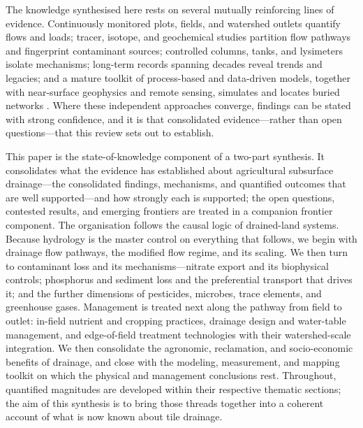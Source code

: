 \documentclass[11pt]{article}
\begin{document}
The knowledge synthesised here rests on several mutually reinforcing lines of
evidence. Continuously monitored plots, fields, and watershed outlets quantify
flows and loads; tracer, isotope, and geochemical studies partition flow
pathways and fingerprint contaminant sources; controlled columns, tanks, and
lysimeters isolate mechanisms; long-term records spanning decades reveal trends
and legacies; and a mature toolkit of process-based and data-driven models,
together with near-surface geophysics and remote sensing, simulates and locates
buried networks
\parencite{Smith2011,Singh2019b,Gowda2012,Allred2020}. Where these independent
approaches converge, findings can be stated with strong confidence, and it is
that consolidated evidence---rather than open questions---that this review sets
out to establish.

This paper is the state-of-knowledge component of a two-part synthesis. It
consolidates what the evidence has established about agricultural subsurface
drainage---the consolidated findings, mechanisms, and quantified outcomes that
are well supported---and how strongly each is supported; the open questions,
contested results, and emerging frontiers are treated in a companion frontier
component. The organisation follows the causal logic of drained-land systems.
Because hydrology is the master control on everything that follows, we begin
with drainage flow pathways, the modified flow regime, and its scaling. We then
turn to contaminant loss and its mechanisms---nitrate export and its biophysical
controls; phosphorus and sediment loss and the preferential transport that
drives it; and the further dimensions of pesticides, microbes, trace elements,
and greenhouse gases. Management is treated next along the pathway from field to
outlet: in-field nutrient and cropping practices, drainage design and
water-table management, and edge-of-field treatment technologies with their
watershed-scale integration. We then consolidate the agronomic, reclamation, and
socio-economic benefits of drainage, and close with the modeling, measurement,
and mapping toolkit on which the physical and management conclusions rest.
Throughout, quantified magnitudes are developed within their respective thematic
sections; the aim of this synthesis is to bring those threads together into a
coherent account of what is now known about tile drainage.

\printbibliography
\end{document}
